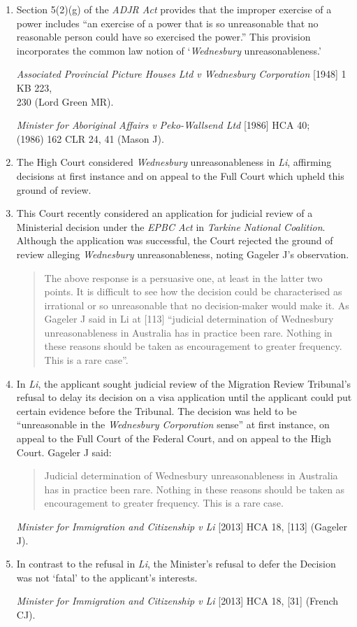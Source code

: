 \documentclass[12pt]{article}
\begin{document}
\begin{enumerate}[1.]
\item
  Section 5(2)(g) of the \emph{ADJR Act} provides that the improper
  exercise of a power includes ``an exercise of a power that is so
  unreasonable that no reasonable person could have so exercised the
  power.'' This provision incorporates the common law notion of
  `\emph{Wednesbury} unreasonableness.'

  \emph{Associated Provincial Picture Houses Ltd v Wednesbury
  Corporation} {[}1948{]} 1 KB 223, \\ 230 (Lord Green MR).

  \emph{Minister for Aboriginal Affairs v Peko-Wallsend Ltd} {[}1986{]}
  HCA 40; \\(1986) 162 CLR 24, 41 (Mason J).
\item
  The High Court considered \emph{Wednesbury} unreasonableness in
  \emph{Li}, affirming decisions at first instance and on appeal to the
  Full Court which upheld this ground of review.
\item
  This Court recently considered an application for judicial review of a
  Ministerial decision under the \emph{EPBC Act} in \emph{Tarkine
  National Coalition}. Although the application was successful, the
  Court rejected the ground of review alleging \emph{Wednesbury}
  unreasonableness, noting Gageler J's observation.

  \begin{quote}
  The above response is a persuasive one, at least in the latter two
  points. It is difficult to see how the decision could be characterised
  as irrational or so unreasonable that no decision-maker would make it.
  As Gageler J said in Li at {[}113{]} ``judicial determination of
  Wednesbury unreasonableness in Australia has in practice been rare.
  Nothing in these reasons should be taken as encouragement to greater
  frequency. This is a rare case''.
  \end{quote}
\item
  In \emph{Li}, the applicant sought judicial review of the Migration
  Review Tribunal's refusal to delay its decision on a visa application
  until the applicant could put certain evidence before the Tribunal.
  The decision was held to be ``unreasonable in the \emph{Wednesbury
  Corporation} sense'' at first instance, on appeal to the Full Court of
  the Federal Court, and on appeal to the High Court. Gageler J said:

  \begin{quote}
  Judicial determination of Wednesbury unreasonableness in Australia has
  in practice been rare. Nothing in these reasons should be taken as
  encouragement to greater frequency. This is a rare case.
  \end{quote}

  \emph{Minister for Immigration and Citizenship v Li} {[}2013{]} HCA
  18, {[}113{]} (Gageler J).
\item
  In contrast to the refusal in \emph{Li}, the Minister's refusal to
  defer the Decision was not `fatal' to the applicant's interests.

  \emph{Minister for Immigration and Citizenship v Li} {[}2013{]} HCA
  18, {[}31{]} (French CJ).
\end{enumerate}
\end{document}
